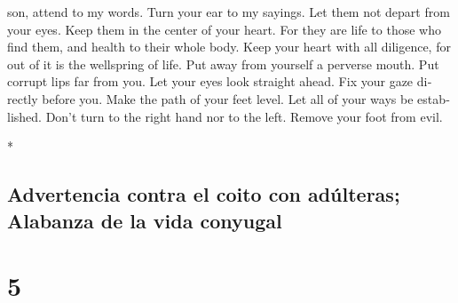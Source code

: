 \begin{paracol}{2}
\begin{otherlanguage}{english}
son, attend to my words. Turn your ear to my sayings. 
Let them not depart from your eyes. Keep them in the center of your
heart.  For they are life to those who find them, and
health to their whole body.  Keep your heart with all
diligence, for out of it is the wellspring of life.  Put
away from yourself a perverse mouth. Put corrupt lips far from you.
 Let your eyes look straight ahead. Fix your gaze
directly before you.  Make the path of your feet level.
Let all of your ways be established.  Don't turn to the
right hand nor to the left. Remove your foot from evil.

\end{otherlanguage}

\switchcolumn[0]*

\hypertarget{advertencia-contra-el-coito-con-aduxfalteras-alabanza-de-la-vida-conyugal}{%
\subsection{Advertencia contra el coito con adúlteras; Alabanza de la
vida
conyugal}\label{advertencia-contra-el-coito-con-aduxfalteras-alabanza-de-la-vida-conyugal}}

\hypertarget{section-8}{%
\section{5}\label{section-8}}


\end{paracol}
